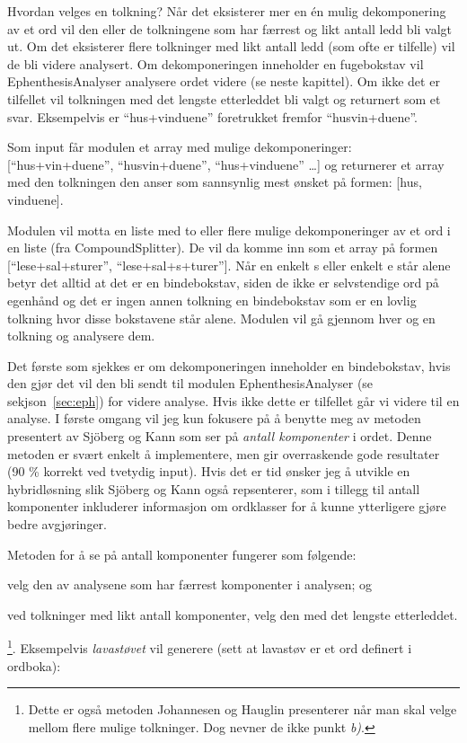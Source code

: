 Hvordan velges en tolkning? Når det eksisterer mer en én mulig dekomponering av et ord vil den eller de tolkningene som har færrest og likt antall ledd bli valgt ut. Om det eksisterer flere tolkninger med likt antall ledd (som ofte er tilfelle) vil de bli videre analysert. Om dekomponeringen inneholder en fugebokstav vil EphenthesisAnalyser analysere ordet videre (se neste kapittel). Om ikke det er tilfellet vil tolkningen med det lengste etterleddet bli valgt og returnert som et svar. Eksempelvis er “hus+vinduene” foretrukket fremfor “husvin+duene”. 

Som input får modulen et array med mulige dekomponeringer: [“hus+vin+duene”, “husvin+duene”, “hus+vinduene” …] og returnerer et array med den tolkningen den anser som sannsynlig mest ønsket på formen: [hus, vinduene]. 

Modulen vil motta en liste med to eller flere mulige dekomponeringer av et ord i en liste (fra CompoundSplitter). De vil da komme inn som et array på formen [“lese+sal+sturer”, “lese+sal+s+turer”]. Når en enkelt s eller enkelt e står alene betyr det alltid at det er en bindebokstav, siden de ikke er selvstendige ord på egenhånd og det er ingen annen tolkning en bindebokstav som er en lovlig tolkning hvor disse bokstavene står alene. Modulen vil gå gjennom hver og en tolkning og analysere dem. 


Det første som sjekkes er om dekomponeringen inneholder en bindebokstav, hvis den gjør det vil den bli sendt til modulen EphenthesisAnalyser (se sekjson~\ref{sec:eph}) for videre analyse. Hvis ikke dette er tilfellet går vi videre til en analyse. I første omgang vil jeg kun fokusere på å benytte meg av metoden presentert av Sjöberg og Kann \cite{sjobergh2004finding} som ser på \textit{antall komponenter} i ordet. Denne metoden er svært enkelt å implementere, men gir overraskende gode resultater (90 \% korrekt ved tvetydig input). Hvis det er tid ønsker jeg å utvikle en hybridløsning slik Sjöberg og Kann også repsenterer, som i tillegg til antall komponenter inkluderer informasjon om ordklasser for å kunne ytterligere gjøre bedre avgjøringer.

Metoden for å se på antall komponenter fungerer som følgende: 
\begin{inparaenum}
\item velg den av analysene som har færrest komponenter i analysen; og
\item ved tolkninger med likt antall komponenter, velg den med det lengste etterleddet.
\end{inparaenum}
\footnote{Dette er også metoden Johannesen og Hauglin \cite{johannessen1996automatic} presenterer når man skal velge mellom flere mulige tolkninger. Dog nevner de ikke punkt \textit{b)}.}. Eksempelvis \textit{lavastøvet} vil generere (sett at lavastøv er et ord definert i ordboka):

